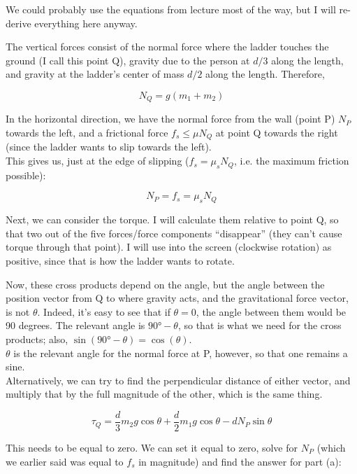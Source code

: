 \documentclass[8.01x]{subfiles}
\begin{document}
We could probably use the equations from lecture most of the way, but I will re-derive everything here anyway.

The vertical forces consist of the normal force where the ladder touches the ground (I call this point Q), gravity due to the person at $d/3$ along the length, and gravity at the ladder's center of mass $d/2$ along the length. Therefore,

\begin{equation}
N_Q = g(m_1 + m_2)
\end{equation}

In the horizontal direction, we have the normal force from the wall (point P) $N_P$ towards the left, and a frictional force $f_s \le \mu N_Q$ at point Q towards the right (since the ladder wants to slip towards the left).\\
This gives us, just at the edge of slipping ($f_s = \mu_s N_Q$, i.e. the maximum friction possible):

\begin{equation}
N_P = f_s = \mu_s N_Q
\end{equation}

Next, we can consider the torque. I will calculate them relative to point Q, so that two out of the five forces/force components ``disappear'' (they can't cause torque through that point). I will use into the screen (clockwise rotation) as positive, since that is how the ladder wants to rotate.

Now, these cross products depend on the angle, but the angle between the position vector from Q to where gravity acts, and the gravitational force vector, is not $\theta$. Indeed, it's easy to see that if $\theta = 0$, the angle between them would be 90 degrees. The relevant angle is $\ang{90} - \theta$, so that is what we need for the cross products; also, $\sin(\ang{90} - \theta) = \cos(\theta)$.\\
$\theta$ is the relevant angle for the normal force at P, however, so that one remains a sine.\\
Alternatively, we can try to find the perpendicular distance of either vector, and multiply that by the full magnitude of the other, which is the same thing.

\begin{equation}
\tau_Q = \frac{d}{3} m_2 g \cos \theta + \frac{d}{2} m_1 g \cos \theta - d N_P \sin \theta
\end{equation}

This needs to be equal to zero. We can set it equal to zero, solve for $N_P$ (which we earlier said was equal to $f_s$ in magnitude) and find the answer for part (a):
\end{document}
